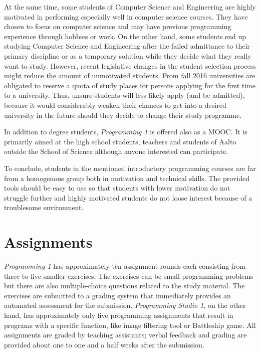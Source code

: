 At the same time, some students of Computer Science and Engineering are highly motivated in performing especially well in computer science courses. They have chosen to focus on computer science and may have previous programming experience through hobbies or work. On the other hand, some students end up studying Computer Science and Engineering after the failed admittance to their primary discipline or as a temporary solution while they decide what they really want to study. However, recent legislative changes in the student selection process might reduce the amount of unmotivated students. From fall 2016 universities are obligated to reserve a quota of study places for persons applying for the first time to a university. Thus, unsure students will less likely apply (and be admitted), because it would considerably weaken their chances to get into a desired university in the future should they decide to change their study programme.

In addition to degree students, \emph{Programming 1} is offered also as a MOOC. It is primarily aimed at the high school students, teachers and students of Aalto outside the School of Science although anyone interested can participate.

To conclude, students in the mentioned introductory programming courses are far from a homogenous group both in motivation and technical skills. The provided tools should be easy to use so that students with lower motivation do not struggle further and highly motivated students do not loose interest because of a troublesome environment.


\section{Assignments}

\emph{Programming 1} has approximately ten assignment rounds each consisting from three to five smaller exercises. The exercises can be small programming problems but there are also multiple-choice questions related to the study material. The exercises are submitted to a grading system that immediately provides an automated assessment for the submission. \emph{Programming Studio 1}, on the other hand, has approximately only five programming assignments that result in programs with a specific function, like image filtering tool or Battleship game. All assignments are graded by teaching assistants; verbal feedback and grading are provided about one to one and a half weeks after the submission.

